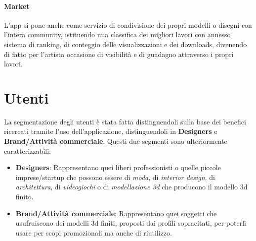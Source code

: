 \documentclass[11pt,fleqn]{book} %
\begin{document}
\paragraph{Market} L'app si  pone anche come servizio di condivisione dei propri modelli o disegni con l'intera community, istituendo una classifica dei migliori lavori con annesso sistema di ranking, di conteggio delle visualizzazioni e dei downloads, divenendo di fatto per l'artista occasione di visibilità e di guadagno attraverso i propri lavori.\\



\section{Utenti}
La segmentazione degli utenti è stata fatta distinguendoli sulla base dei benefici ricercati tramite l'uso dell'applicazione, distinguendoli in \textbf{Designers} e \textbf{Brand/Attività commerciale}. Questi due segmenti sono ulteriormente caratterizzabili:
\begin{itemize}
\item \textbf{Designers}: Rappresentano quei liberi professionisti o quelle piccole imprese/startup che possono essere di \emph{moda}, di\emph{ interior design}, di \emph{architettura}, di \emph{videogiochi} o di\emph{ modellazione 3d} che producono il modello 3d finito.
\item \textbf{Brand/Attività commerciale}: Rappresentano quei soggetti che usufruiscono dei modelli 3d finiti, proposti dai profili sopracitati, per poterli usare per scopi promozionali ma anche di riutilizzo.
\end{itemize}



\newpage
\end{document}
